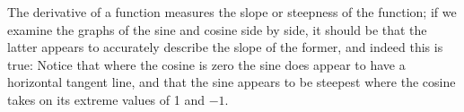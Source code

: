 The derivative of a function measures the slope or steepness of the
function; if we examine the graphs of the sine and cosine side by
side, it should be that the latter appears to accurately describe the
slope of the former, and indeed this is true:
Notice that where the cosine is zero the sine does appear to have a
horizontal tangent line, and that the sine appears to be steepest
where the cosine takes on its extreme values of 1 and $-1$.

